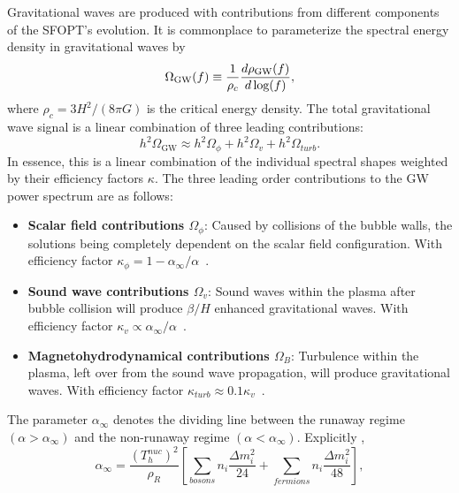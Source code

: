 \documentclass[nofootinbib,twocolumn,preprintnumbers]{revtex4-1}
\begin{document}
Gravitational waves are produced with contributions from different components of the SFOPT's evolution.  It is commonplace to parameterize the spectral energy density in gravitational waves by~\citep{PhysRevD.75.043507} 
\begin{equation}
\Omega_{\textrm{GW}} (f) \equiv \frac{1}{ \rho_{c}} \frac{d \rho_{\textrm{GW}}(f) }{d \textrm{\,log}(f)} , 
\end{equation}
where $\rho_{c} = 3H^2/(8 \pi G)$ is the critical energy density. The total gravitational wave signal is a linear combination of three leading contributions:
\begin{equation}
h^2\Omega_{\textrm{GW}} \approx h^2\Omega_{\phi} + h^2\Omega_{v} + h^2\Omega_{turb} .
\end{equation}
In essence, this is a linear combination of the individual spectral shapes weighted by their efficiency factors $\kappa$. 
The three leading order contributions to the GW power spectrum are as follows:
\begin{itemize}
\item \textbf{Scalar field contributions $\Omega_{\phi}$}: Caused by collisions of the bubble walls, the solutions being completely dependent on the scalar field configuration. With efficiency factor $\kappa_{\phi} = 1 - \alpha_{\infty}/\alpha$~\citep{PhysRevD.45.4514, Huber_2008}. 
\item \textbf{Sound wave contributions $\Omega_{v}$}: Sound waves within the plasma after bubble collision will produce $\beta/H$ enhanced gravitational waves. With efficiency factor $\kappa_{v} \propto \alpha_{\infty}/\alpha$~\citep{PhysRevLett.112.041301}.
\item \textbf{Magnetohydrodynamical contributions $\Omega_{B}$}: Turbulence within the plasma, left over from the sound wave propagation, will produce gravitational waves. With efficiency factor $\kappa_{
turb} \approx 0.1 \kappa_{v} $~\citep{PhysRevD.74.063521}.
\end{itemize}
The parameter $\alpha_{\infty}$ denotes the dividing line between the runaway regime  $(\alpha >\alpha_{\infty})$ and the non-runaway regime $(\alpha <\alpha_{\infty})$. Explicitly \cite{Breitbach:2018ddu, Caprini:2015zlo, Espinosa:2010hh}, 
\begin{equation}\label{eqn:critPTstrength}
\alpha_{\infty} = \frac{(T^{nuc}_h)^2}{\rho_R}\left[\sum_{bosons} n_i\frac{\Delta m^2_i}{24} + \sum_{fermions} n_i\frac{\Delta m_i^2}{48}\right],
\end{equation} 
\end{document}
